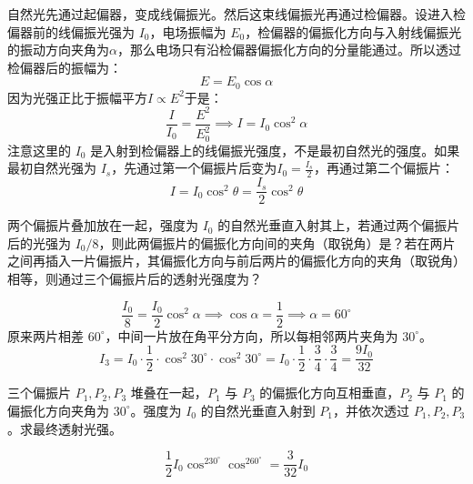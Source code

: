 \begin{theorem}
自然光先通过起偏器，变成线偏振光。然后这束线偏振光再通过检偏器。设进入检偏器前的线偏振光强为 \(I_0\)，电场振幅为 \(E_0\)，检偏器的偏振化方向与入射线偏振光的振动方向夹角为\(\alpha\)，那么电场只有沿检偏器偏振化方向的分量能通过。所以透过检偏器后的振幅为：
\[
E=E_0\cos\alpha
\]因为光强正比于振幅平方\(I\propto E^2\)于是：
\[
\frac{I}{I_0}=\frac{E^2}{E_0^2}\implies I=I_0\cos^2\alpha
\]注意这里的 \(I_0\) 是入射到检偏器上的线偏振光强度，不是最初自然光的强度。如果最初自然光强为 \(I_s\)，先通过第一个偏振片后变为\(I_0=\frac{I_s}{2}\)，再通过第二个偏振片：
\[
I=I_0\cos^2\theta=\frac{I_s}{2}\cos^2\theta
\]
\end{theorem}

\begin{exercise}[两片偏振片]
两个偏振片叠加放在一起，强度为 \(I_0\) 的自然光垂直入射其上，若通过两个偏振片后的光强为 \(I_0/8\)，则此两偏振片的偏振化方向间的夹角（取锐角）是？若在两片之间再插入一片偏振片，其偏振化方向与前后两片的偏振化方向的夹角（取锐角）相等，则通过三个偏振片后的透射光强度为？
\end{exercise}
\begin{solution}
\[\frac{I_0}{8}=\frac{I_0}{2}\cos^2\alpha\implies \cos\alpha=\frac12\implies \alpha=60^\circ\]
原来两片相差 \(60^\circ\)，中间一片放在角平分方向，所以每相邻两片夹角为 \(30^\circ\)。
\[I_3=I_0\cdot\frac12\cdot\cos^2 30^\circ\cdot\cos^2 30^\circ=I_0\cdot\frac12\cdot\frac34\cdot\frac34=\frac{9I_0}{32}\]
\end{solution}


\begin{exercise}
三个偏振片 \(P_1,P_2,P_3\) 堆叠在一起，\(P_1\) 与 \(P_3\) 的偏振化方向互相垂直，\(P_2\) 与 \(P_1\) 的偏振化方向夹角为 \(30^\circ\)。强度为 \(I_0\) 的自然光垂直入射到 \(P_1\)，并依次透过 \(P_1,P_2,P_3\)。求最终透射光强。
\end{exercise}
\begin{solution}
\[\frac12I_0\cos^230^\circ\cos^260^\circ=\frac{3}{32}I_0\]
\end{solution}
